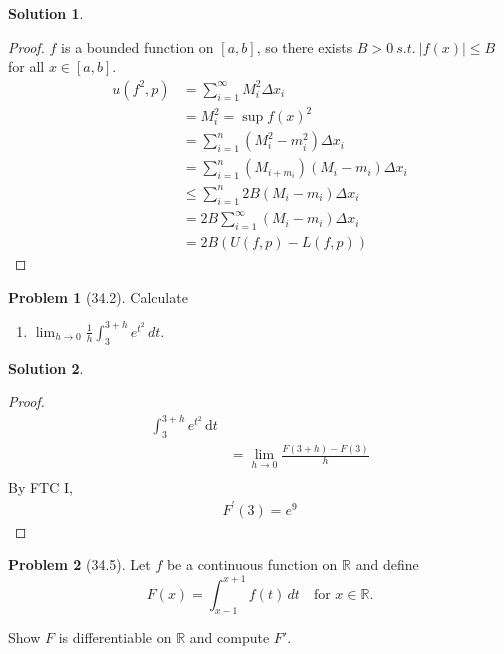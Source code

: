 \documentclass[12pt]{article}
\theoremstyle{definition} %
\newtheorem{solution}{Solution}
\newtheorem{problem}{Problem}
\theoremstyle{plain} %
\begin{document}
\begin{solution}
    \begin{proof}
        $f$ is a bounded function on $[a,b]$, so there exists $B>0 \ s.t. \ \left\vert f(x) \right\vert \leq B$ for all $x\in[a,b]$.
        \begin{align}
            u(f^{2},p) &= \sum_{i=1}^{\infty} M_i^{2}\Delta x_{i} \\[10pt] 
            &= M_i^{2} = \sup f(x)^{2} \\[10pt] 
            &= \sum_{i=1}^{n} \left( M_i^{2}-m_i^{2} \right)\Delta x_i \\[10pt] 
            &= \sum_{i=1}^{n} \left( M_{i+m_i}  \right)\left( M_{i} - m_i \right)\Delta x_{i} \\[10pt] 
            &\leq \sum_{i=1}^{n} 2B\left( M_{i}-m_{i} \right)\Delta x_{i} \\[10pt] 
            &= 2B \sum_{i=1}^{\infty} \left( M_i - m_i \right)\Delta x_{i} \\[10pt] 
            &= 2B \left( U(f,p)-L(f,p) \right) 
        \end{align} 
    \end{proof}
\end{solution}
\begin{problem}[34.2]
    \noindent Calculate

\begin{enumerate}
    \item $ \lim_{h \to 0} \frac{1}{h} \int_3^{3+h} e^{t^2} \, dt $.
\end{enumerate}
\end{problem}
\begin{solution}
   \begin{proof}
    \begin{align}
        \int_{3}^{3+h}e^{t^{2}} \,\mathrm{d}t \\[10pt] 
        &= \lim_{h \to 0} \frac{F(3+h)-F(3)}{h}\\[10pt] 
    \end{align}
    By FTC I,
    \begin{align}
        F^\prime (3)  = e^{9} 
    \end{align}
   \end{proof} 
\end{solution}
\begin{problem}[34.5]
    \noindent  Let $ f $ be a continuous function on $ \mathbb{R} $ and define
$$
F(x) = \int_{x-1}^{x+1} f(t) \, dt \quad \text{for } x \in \mathbb{R}.
$$

Show $ F $ is differentiable on $ \mathbb{R} $ and compute $ F' $.
\end{problem}
\end{document}
